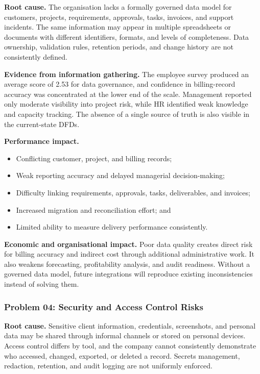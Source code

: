 \documentclass[12pt,a4paper]{report}
\begin{document}
\textbf{Root cause.}
The organisation lacks a formally governed data model for customers, projects, requirements,
approvals, tasks, invoices, and support incidents. The same information may appear in multiple
spreadsheets or documents with different identifiers, formats, and levels of completeness. Data
ownership, validation rules, retention periods, and change history are not consistently defined.

\textbf{Evidence from information gathering.}
The employee survey produced an average score of 2.53 for data governance, and confidence in
billing-record accuracy was concentrated at the lower end of the scale. Management reported
only moderate visibility into project risk, while HR identified weak knowledge and capacity
tracking. The absence of a single source of truth is also visible in the current-state DFDs.

\textbf{Performance impact.}
\begin{itemize}[leftmargin=1.6em]
    \item Conflicting customer, project, and billing records;
    \item Weak reporting accuracy and delayed managerial decision-making;
    \item Difficulty linking requirements, approvals, tasks, deliverables, and invoices;
    \item Increased migration and reconciliation effort; and
    \item Limited ability to measure delivery performance consistently.
\end{itemize}

\textbf{Economic and organisational impact.}
Poor data quality creates direct risk for billing accuracy and indirect cost through additional
administrative work. It also weakens forecasting, profitability analysis, and audit readiness.
Without a governed data model, future integrations will reproduce existing inconsistencies
instead of solving them.

\subsubsection{Problem 04: Security and Access Control Risks}\label{sec:rc-security}

\textbf{Root cause.}
Sensitive client information, credentials, screenshots, and personal data may be shared through
informal channels or stored on personal devices. Access control differs by tool, and the company
cannot consistently demonstrate who accessed, changed, exported, or deleted a record. Secrets
management, redaction, retention, and audit logging are not uniformly enforced.
\end{document}
